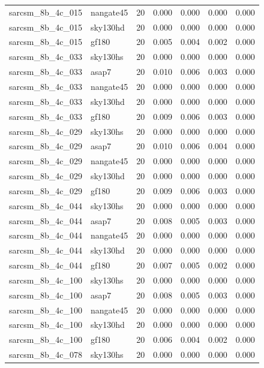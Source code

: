 \begin{tabular}{llrrrrr}
sarcsm\_8b\_4c\_015 & nangate45 & 20 & 0.000 & 0.000 & 0.000 & 0.000 \\
sarcsm\_8b\_4c\_015 & sky130hd & 20 & 0.000 & 0.000 & 0.000 & 0.000 \\
sarcsm\_8b\_4c\_015 & gf180 & 20 & 0.005 & 0.004 & 0.002 & 0.000 \\
sarcsm\_8b\_4c\_033 & sky130hs & 20 & 0.000 & 0.000 & 0.000 & 0.000 \\
sarcsm\_8b\_4c\_033 & asap7 & 20 & 0.010 & 0.006 & 0.003 & 0.000 \\
sarcsm\_8b\_4c\_033 & nangate45 & 20 & 0.000 & 0.000 & 0.000 & 0.000 \\
sarcsm\_8b\_4c\_033 & sky130hd & 20 & 0.000 & 0.000 & 0.000 & 0.000 \\
sarcsm\_8b\_4c\_033 & gf180 & 20 & 0.009 & 0.006 & 0.003 & 0.000 \\
sarcsm\_8b\_4c\_029 & sky130hs & 20 & 0.000 & 0.000 & 0.000 & 0.000 \\
sarcsm\_8b\_4c\_029 & asap7 & 20 & 0.010 & 0.006 & 0.004 & 0.000 \\
sarcsm\_8b\_4c\_029 & nangate45 & 20 & 0.000 & 0.000 & 0.000 & 0.000 \\
sarcsm\_8b\_4c\_029 & sky130hd & 20 & 0.000 & 0.000 & 0.000 & 0.000 \\
sarcsm\_8b\_4c\_029 & gf180 & 20 & 0.009 & 0.006 & 0.003 & 0.000 \\
sarcsm\_8b\_4c\_044 & sky130hs & 20 & 0.000 & 0.000 & 0.000 & 0.000 \\
sarcsm\_8b\_4c\_044 & asap7 & 20 & 0.008 & 0.005 & 0.003 & 0.000 \\
sarcsm\_8b\_4c\_044 & nangate45 & 20 & 0.000 & 0.000 & 0.000 & 0.000 \\
sarcsm\_8b\_4c\_044 & sky130hd & 20 & 0.000 & 0.000 & 0.000 & 0.000 \\
sarcsm\_8b\_4c\_044 & gf180 & 20 & 0.007 & 0.005 & 0.002 & 0.000 \\
sarcsm\_8b\_4c\_100 & sky130hs & 20 & 0.000 & 0.000 & 0.000 & 0.000 \\
sarcsm\_8b\_4c\_100 & asap7 & 20 & 0.008 & 0.005 & 0.003 & 0.000 \\
sarcsm\_8b\_4c\_100 & nangate45 & 20 & 0.000 & 0.000 & 0.000 & 0.000 \\
sarcsm\_8b\_4c\_100 & sky130hd & 20 & 0.000 & 0.000 & 0.000 & 0.000 \\
sarcsm\_8b\_4c\_100 & gf180 & 20 & 0.006 & 0.004 & 0.002 & 0.000 \\
sarcsm\_8b\_4c\_078 & sky130hs & 20 & 0.000 & 0.000 & 0.000 & 0.000 \\

\end{tabular}
